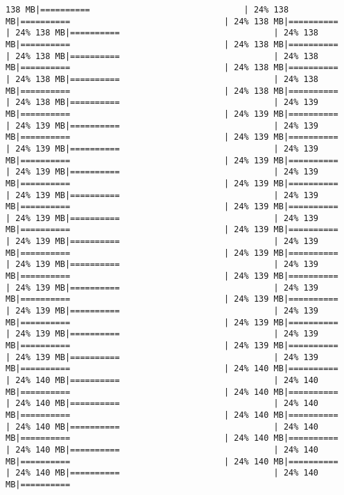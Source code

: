 \documentclass[
]{article}
\begin{document}
\begin{verbatim}
138 MB|==========                               | 24% 138 MB|==========                               | 24% 138 MB|==========                               | 24% 138 MB|==========                               | 24% 138 MB|==========                               | 24% 138 MB|==========                               | 24% 138 MB|==========                               | 24% 138 MB|==========                               | 24% 138 MB|==========                               | 24% 138 MB|==========                               | 24% 138 MB|==========                               | 24% 138 MB|==========                               | 24% 138 MB|==========                               | 24% 139 MB|==========                               | 24% 139 MB|==========                               | 24% 139 MB|==========                               | 24% 139 MB|==========                               | 24% 139 MB|==========                               | 24% 139 MB|==========                               | 24% 139 MB|==========                               | 24% 139 MB|==========                               | 24% 139 MB|==========                               | 24% 139 MB|==========                               | 24% 139 MB|==========                               | 24% 139 MB|==========                               | 24% 139 MB|==========                               | 24% 139 MB|==========                               | 24% 139 MB|==========                               | 24% 139 MB|==========                               | 24% 139 MB|==========                               | 24% 139 MB|==========                               | 24% 139 MB|==========                               | 24% 139 MB|==========                               | 24% 139 MB|==========                               | 24% 139 MB|==========                               | 24% 139 MB|==========                               | 24% 139 MB|==========                               | 24% 139 MB|==========                               | 24% 139 MB|==========                               | 24% 139 MB|==========                               | 24% 139 MB|==========                               | 24% 139 MB|==========                               | 24% 139 MB|==========                               | 24% 139 MB|==========                               | 24% 139 MB|==========                               | 24% 139 MB|==========                               | 24% 139 MB|==========                               | 24% 140 MB|==========                               | 24% 140 MB|==========                               | 24% 140 MB|==========                               | 24% 140 MB|==========                               | 24% 140 MB|==========                               | 24% 140 MB|==========                               | 24% 140 MB|==========                               | 24% 140 MB|==========                               | 24% 140 MB|==========                               | 24% 140 MB|==========                               | 24% 140 MB|==========                               | 24% 140 MB|==========                               | 24% 140 MB|==========                               | 24% 140 MB|==========                               | 24% 140 MB|==========        
\end{verbatim}
\end{document}
